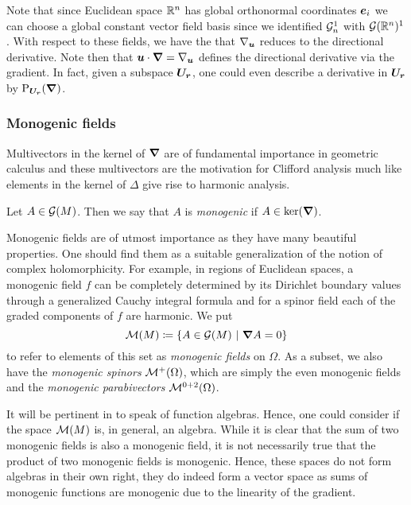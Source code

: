 Note that since Euclidean space $\mathbb{R}^n$ has global orthonormal coordinates $\boldsymbol{e}_i$ we can choose a global constant vector field basis since we identified $\mathcal{G}_n^1$ with $\mathcal{G}(\mathbb{R}^n)^1$. With respect to these fields, we have the that $\nabla_{\boldsymbol{u}}$ reduces to the directional derivative. Note then that $\boldsymbol{u} \cdot \boldsymbol{\nabla} = \nabla_{\boldsymbol{u}}$ defines the directional derivative via the gradient. In fact, given a subspace $\boldsymbol{U_r}$, one could even describe a derivative in $\boldsymbol{U_r}$ by $\operatorname{P}_{\boldsymbol{U_r}}(\boldsymbol{\nabla})$.

\subsubsection{Monogenic fields}

Multivectors in the kernel of $\boldsymbol{\nabla}$ are of fundamental importance in geometric calculus and these multivectors are the motivation for Clifford analysis much like elements in the kernel of $\Delta$ give rise to harmonic analysis. 
\begin{definition}
 Let $A \in \mathcal{G}(M)$. Then we say that $A$ is \emph{monogenic} if $A \in \ker(\boldsymbol{\nabla})$.
\end{definition}

Monogenic fields are of utmost importance as they have many beautiful properties. One should find them as a suitable generalization of the notion of complex holomorphicity. For example, in regions of Euclidean spaces, a monogenic field $f$ can be completely determined by its Dirichlet boundary values through a generalized Cauchy integral formula and for a spinor field each of the graded components of $f$ are harmonic. We put 
\[
\mathcal{M}(M) \coloneqq \{A \in \mathcal{G}(M) ~\vert~ \boldsymbol{\nabla} A =0\}
\]
to refer to elements of this set as \emph{monogenic fields} on $\Omega$. As a subset, we also have the \emph{monogenic spinors} $\mathcal{M}^+(\Omega)$, which are simply the even monogenic fields and the \emph{monogenic parabivectors} $\mathcal{M}^{0+2}(\Omega)$. 

It will be pertinent in  to speak of function algebras. Hence, one could consider if the space $\mathcal{M}(M)$ is, in general, an algebra. While it is clear that the sum of two monogenic fields is also a monogenic field, it is not necessarily true that the product of two monogenic fields is monogenic. Hence, these spaces do not form algebras in their own right, they do indeed form a vector space as sums of monogenic functions are monogenic due to the linearity of the gradient. 

